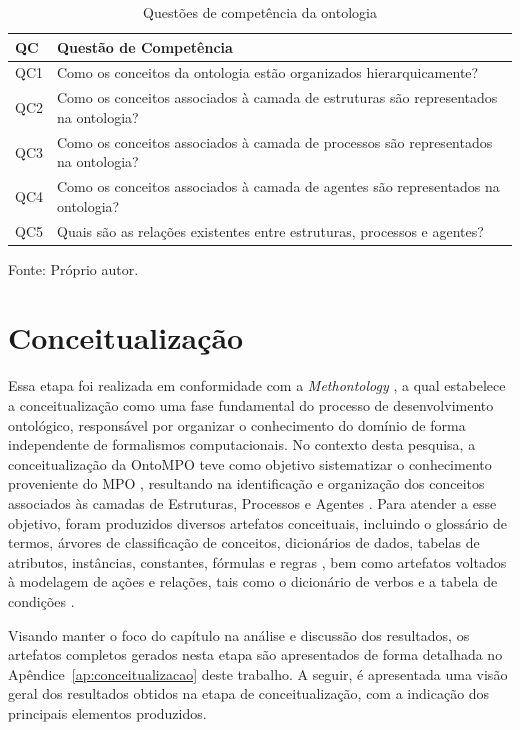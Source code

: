 \begin{table}[H]
\centering
\caption{Questões de competência da ontologia}
\label{quadro:qcs}

\begin{tabular}{p{2cm} p{12cm}}
\hline
\textbf{QC} & \textbf{Questão de Competência} \\
\hline
QC1 & Como os conceitos da ontologia estão organizados hierarquicamente? \\
QC2 & Como os conceitos associados à camada de estruturas são representados na ontologia? \\
QC3 & Como os conceitos associados à camada de processos são representados na ontologia? \\
QC4 & Como os conceitos associados à camada de agentes são representados na ontologia? \\
QC5 & Quais são as relações existentes entre estruturas, processos e agentes? \\
\hline
\end{tabular}

Fonte: Próprio autor.
\end{table}

\section{Conceitualização}

Essa etapa foi realizada em conformidade com a \textit{Methontology} \cite{fernandez1997methontology}, a qual estabelece a conceitualização como uma fase fundamental do processo de desenvolvimento ontológico, responsável por organizar o conhecimento do domínio de forma independente de formalismos computacionais. No contexto desta pesquisa, a conceitualização da OntoMPO teve como objetivo sistematizar o conhecimento proveniente do MPO \cite{vieira2022thesis}, resultando na identificação e organização dos conceitos associados às camadas de Estruturas, Processos e Agentes \cite{vieira2022thesis}. Para atender a esse objetivo, foram produzidos diversos artefatos conceituais, incluindo o glossário de termos, árvores de classificação de conceitos, dicionários de dados, tabelas de atributos, instâncias, constantes, fórmulas e regras \cite{fernandez1997methontology}, bem como artefatos voltados à modelagem de ações e relações, tais como o dicionário de verbos e a tabela de condições \cite{fernandez1997methontology}.

Visando manter o foco do capítulo na análise e discussão dos resultados, os artefatos completos gerados nesta etapa são apresentados de forma detalhada no Apêndice~\ref{ap:conceitualizacao} deste trabalho. A seguir, é apresentada uma visão geral dos resultados obtidos na etapa de conceitualização, com a indicação dos principais elementos produzidos.

